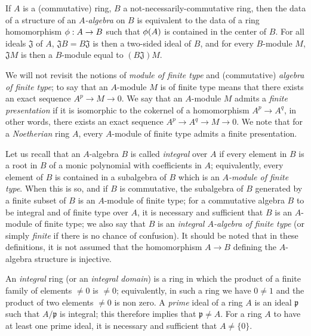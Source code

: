 \begin{env}[1.0.4]
\label{env-0.1.0.4}
If $A$ is a (commutative) ring, $B$ a not-necessarily-commutative ring, then the data
of a structure of an {\em $A$-algebra} on $B$ is equivalent to the data of a
ring homomorphism $\phi:A\to B$ such that $\phi(A)$ is contained in the center
of $B$. For all ideals $\mathfrak{J}$ of $A$, $\mathfrak{J}B=B\mathfrak{J}$ is
then a two-sided ideal of $B$, and for every $B$-module $M$, $\mathfrak{J}M$ is
then a $B$-module equal to $(B\mathfrak{J})M$.
\end{env}

\begin{env}[1.0.5]
\label{env-0.1.0.5}
We will not revisit the notions of {\em module of finite type} and
(commutative) {\em algebra of finite type}; to say that an $A$-module $M$ is of
finite type means that there exists
an exact sequence $A^p\to M\to 0$. We say that an $A$-module $M$ admits a
{\em finite presentation} if it is isomorphic to the cokernel of a homomorphism
$A^p\to A^q$, in other words, there exists an exact sequence
$A^p\to A^q\to M\to 0$. We note that for a {\em Noetherian} ring $A$, every
$A$-module of finite type admits a finite presentation.

Let us recall that an $A$-algebra $B$ is called {\em integral} over $A$ if
every element in $B$ is a root in $B$ of a monic polynomial with coefficients in
$A$; equivalently, every element of $B$ is contained in a subalgebra of $B$
which is an {\em $A$-module of finite type}. When this is so, and if $B$ is
commutative, the subalgebra of $B$ generated by a finite subset of $B$ is an
$A$-module of finite type; for a commutative algebra $B$ to be integral and of
finite type over $A$, it is necessary and sufficient that $B$ is an $A$-module
of finite type; we also say that $B$ is an {\em integral $A$-algebra of finite
type} (or simply {\em finite} if there is no chance of confusion). It should be
noted that in these definitions, it is not assumed that the homomorphism
$A\to B$ defining the $A$-algebra structure is injective.
\end{env}

\begin{env}[1.0.6]
\label{env-0.1.0.6}
An {\em integral} ring (or an {\em integral domain}) is a ring in which the
product of a finite family of elements $\neq 0$ is $\neq 0$; equivalently, in
such a ring we have $0\neq 1$ and the product of two elements $\neq 0$ is non
zero. A {\em prime} ideal of a ring $A$ is an ideal $\mathfrak{p}$ such that
$A/\mathfrak{p}$ is integral; this therefore implies that $\mathfrak{p}\neq A$.
For a ring $A$ to have at least one prime ideal, it is necessary and sufficient
that $A\neq\{0\}$.
\end{env}

